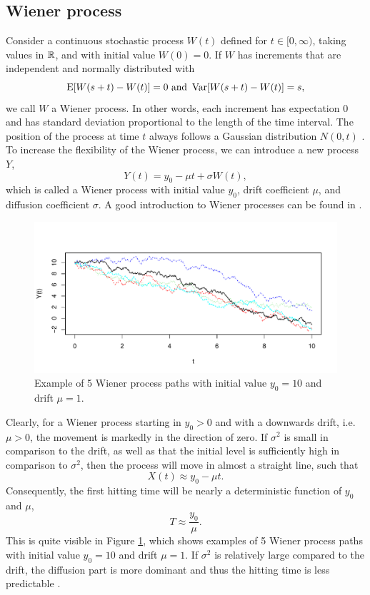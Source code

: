 \subsection{Wiener process}
Consider a continuous stochastic process $W(t)$ defined for $t\in[0,\infty)$, taking values in $\mathbb{R}$, and with initial value $W(0)=0$. If $W$ has increments that are independent and normally distributed with
\begin{equation*}
    \operatorname{E}[W(s+t)-W(t)]=0\text{   and   }\operatorname{Var}[W(s+t)-W(t)]=s,
\end{equation*}
we call $W$ a Wiener process. In other words, each increment has expectation 0 and has standard deviation proportional to the length of the time interval. The position of the process at time $t$ always follows a Gaussian distribution $N(0, t)$ \citep{ABG}. To increase the flexibility of the Wiener process, we can introduce a new process $Y$,
\begin{equation}\label{wiener}
    Y(t)=y_0-\mu t+\sigma W(t),
\end{equation}
which is called a Wiener process with initial value $y_0$, drift coefficient $\mu$, and diffusion coefficient $\sigma$. A good introduction to Wiener processes can be found in \citet{cox1965}.
\begin{figure}[H]
\label{plot:wiener}
\caption{Example of 5 Wiener process paths with initial value $y_0=10$ and drift $\mu=1$.}
\centering
\includegraphics[scale=0.4]{figures/wiener_processes.pdf}
\end{figure}
\noindent{}Clearly, for a Wiener process starting in $y_0>0$ and with a downwards drift, i.e. $\mu>0$, the movement is markedly in the direction of zero. If $\sigma^2$ is small in comparison to the drift, as well as that the initial level is sufficiently high in comparison to $\sigma^2$, then the process will move in almost a straight line, such that
\begin{equation*}
    X(t)\approx y_0-\mu t.
\end{equation*}
Consequently, the first hitting time will be nearly a deterministic function of $y_0$ and $\mu$,
\begin{equation}
    T\approx \frac{y_0}{\mu}.
\end{equation}
This is quite visible in Figure \ref{plot:wiener}, which shows examples of 5 Wiener process paths with initial value $y_0=10$ and drift $\mu=1$. If $\sigma^2$ is relatively large compared to the drift, the diffusion part is more dominant and thus the hitting time is less predictable \citep{ABG}.

